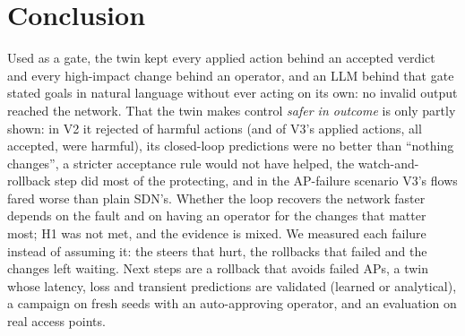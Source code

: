 \documentclass[conference]{IEEEtran}
\begin{document}
\section{Conclusion}
Used as a gate, the twin kept every applied action behind an accepted verdict and every high-impact change behind an operator, and an LLM behind that gate stated goals in natural language without ever acting on its own: no invalid output reached the network. That the twin makes control \emph{safer in outcome} is only partly shown: in V2 it rejected \HarmRejected{} of \HarmAll{} harmful actions (and \HarmVthree{} of V3's applied actions, all accepted, were harmful), its closed-loop predictions were no better than ``nothing changes'', a stricter acceptance rule would not have helped, the watch-and-rollback step did most of the protecting, and in the AP-failure scenario V3's flows fared worse than plain SDN's. Whether the loop recovers the network faster depends on the fault and on having an operator for the changes that matter most; H1 was not met, and the evidence is mixed. We measured each failure instead of assuming it: the steers that hurt, the rollbacks that failed and the changes left waiting. Next steps are a rollback that avoids failed APs, a twin whose latency, loss and transient predictions are validated (learned or analytical), a campaign on fresh seeds with an auto-approving operator, and an evaluation on real access points.



\end{document}
